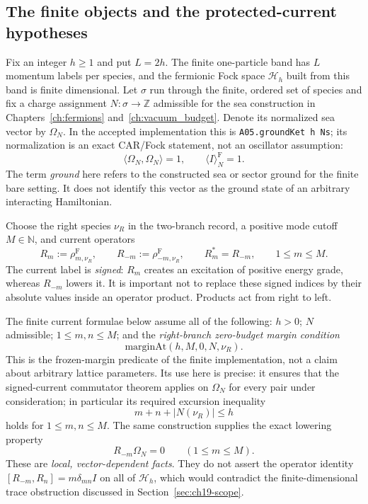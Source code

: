 \subsection{The finite objects and the protected-current hypotheses}

Fix an integer $h\geq1$ and put $L=2h$.  The finite one-particle band has
$L$ momentum labels per species, and the fermionic Fock space
$\mathcal H_h$ built from this band is finite dimensional.  Let $\sigma$
run through the finite, ordered set of species and fix a charge assignment
$N:\sigma\to\mathbb Z$ admissible for the sea construction in
Chapters~\ref{ch:fermions} and~\ref{ch:vacuum_budget}.  Denote its
normalized sea vector by $\Omega_N$.  In the accepted implementation this
is \texttt{A05.groundKet h Ns}; its normalization is an exact CAR/Fock
statement, not an oscillator assumption:
\begin{equation}
 \langle\Omega_N,\Omega_N\rangle=1,
 \qquad \langle I\rangle_N^{\mathrm F}=1.
 \label{eq:ch19-comp-normalized}
\end{equation}
The term \emph{ground} here refers to the constructed sea or sector ground
for the finite bare setting.  It does not identify this vector as the ground
state of an arbitrary interacting Hamiltonian.

Choose the right species $\nu_R$ in the two-branch record, a positive
mode cutoff $M\in\mathbb N$, and current operators
\begin{equation}
 R_m:=\rho_{m,\nu_R}^{\mathrm F},\qquad
 R_{-m}:=\rho_{-m,\nu_R}^{\mathrm F},\qquad
 R_m^*=R_{-m},\qquad 1\leq m\leq M.
 \label{eq:ch19-comp-current-def}
\end{equation}
The current label is \emph{signed}: $R_m$ creates an excitation of
positive energy grade, whereas $R_{-m}$ lowers it.  It is important not to
replace these signed indices by their absolute values inside an operator
product.  Products act from right to left.

The finite current formulae below assume all of the following:
$h>0$; $N$ admissible; $1\leq m,n\leq M$; and the
\emph{right-branch zero-budget margin condition}
\begin{equation}
 \mathrm{marginAt}(h,M,0,N,\nu_R).
 \label{eq:ch19-comp-margin}
\end{equation}
This is the frozen-margin predicate of the finite implementation, not a
claim about arbitrary lattice parameters.  Its use here is precise: it
ensures that the signed-current commutator theorem applies on $\Omega_N$
for every pair under consideration; in particular its required excursion
inequality
\begin{equation}
 m+n+|N(\nu_R)|\leq h
 \label{eq:ch19-comp-excursion}
\end{equation}
holds for $1\leq m,n\leq M$.  The same construction supplies the
exact lowering property
\begin{equation}
 R_{-m}\Omega_N=0\qquad(1\leq m\leq M).
 \label{eq:ch19-comp-lowering}
\end{equation}
These are \emph{local, vector-dependent facts}.  They do not assert the
operator identity $[R_{-m},R_n]=m\delta_{mn}I$ on all of
$\mathcal H_h$, which would contradict the finite-dimensional trace
obstruction discussed in Section~\ref{sec:ch19-scope}.

